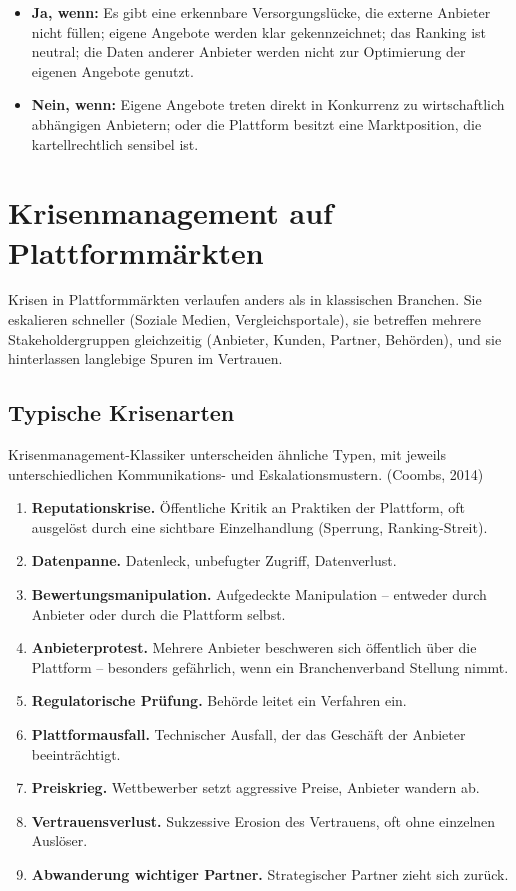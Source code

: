 \documentclass[11pt,a4paper,oneside]{article}
\newcommand{\fachbegriff}[1]{\textbf{#1}}
\newcommand{\quelle}[1]{{\footnotesize\color{lpGray}(#1)}}
\begin{document}
\begin{itemize}
  \item \textbf{Ja, wenn:} Es gibt eine erkennbare Versorgungslücke, die externe Anbieter nicht füllen; eigene Angebote werden klar gekennzeichnet; das Ranking ist neutral; die Daten anderer Anbieter werden nicht zur Optimierung der eigenen Angebote genutzt.
  \item \textbf{Nein, wenn:} Eigene Angebote treten direkt in Konkurrenz zu wirtschaftlich abhängigen Anbietern; oder die Plattform besitzt eine Marktposition, die kartellrechtlich sensibel ist.
\end{itemize}

\section{Krisenmanagement auf Plattformmärkten}

Krisen in Plattformmärkten verlaufen anders als in klassischen Branchen. Sie eskalieren schneller (Soziale Medien, Vergleichsportale), sie betreffen mehrere Stakeholdergruppen gleichzeitig (Anbieter, Kunden, Partner, Behörden), und sie hinterlassen langlebige Spuren im Vertrauen.

\subsection{Typische Krisenarten}

Krisenmanagement-Klassiker unterscheiden ähnliche Typen, mit jeweils unterschiedlichen Kommunikations- und Eskalationsmustern. \quelle{Coombs, 2014}

\begin{enumerate}
  \item \fachbegriff{Reputationskrise.} Öffentliche Kritik an Praktiken der Plattform, oft ausgelöst durch eine sichtbare Einzelhandlung (Sperrung, Ranking-Streit).
  \item \fachbegriff{Datenpanne.} Datenleck, unbefugter Zugriff, Datenverlust.
  \item \fachbegriff{Bewertungsmanipulation.} Aufgedeckte Manipulation -- entweder durch Anbieter oder durch die Plattform selbst.
  \item \fachbegriff{Anbieterprotest.} Mehrere Anbieter beschweren sich öffentlich über die Plattform -- besonders gefährlich, wenn ein Branchenverband Stellung nimmt.
  \item \fachbegriff{Regulatorische Prüfung.} Behörde leitet ein Verfahren ein.
  \item \fachbegriff{Plattformausfall.} Technischer Ausfall, der das Geschäft der Anbieter beeinträchtigt.
  \item \fachbegriff{Preiskrieg.} Wettbewerber setzt aggressive Preise, Anbieter wandern ab.
  \item \fachbegriff{Vertrauensverlust.} Sukzessive Erosion des Vertrauens, oft ohne einzelnen Auslöser.
  \item \fachbegriff{Abwanderung wichtiger Partner.} Strategischer Partner zieht sich zurück.
\end{enumerate}
\end{document}
